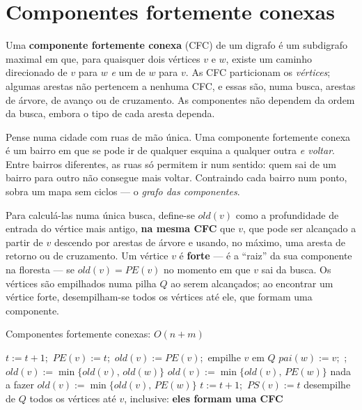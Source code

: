\section{Componentes fortemente conexas}\label{sec:cfc}
Uma \textbf{componente fortemente conexa} (CFC) de um digrafo é um subdigrafo maximal em que, para quaisquer dois vértices $v$ e $w$, existe um caminho direcionado de $v$ para $w$ \emph{e} um de $w$ para $v$. As CFC particionam os \emph{vértices}; algumas arestas não pertencem a nenhuma CFC, e essas são, numa busca, arestas de árvore, de avanço ou de cruzamento. As componentes não dependem da ordem da busca, embora o tipo de cada aresta dependa.

\begin{intuicao}
Pense numa cidade com ruas de mão única. Uma componente fortemente conexa é um bairro em que se pode ir de qualquer esquina a qualquer outra \emph{e voltar}. Entre bairros diferentes, as ruas só permitem ir num sentido: quem sai de um bairro para outro não consegue mais voltar. Contraindo cada bairro num ponto, sobra um mapa sem ciclos --- o \emph{grafo das componentes}.
\end{intuicao}

Para calculá-las numa única busca, define-se $old(v)$ como a profundidade de entrada do vértice mais antigo, \textbf{na mesma CFC} que $v$, que pode ser alcançado a partir de $v$ descendo por arestas de árvore e usando, no máximo, uma aresta de retorno ou de cruzamento. Um vértice $v$ é \textbf{forte} --- é a ``raiz'' da sua componente na floresta --- se $old(v)=PE(v)$ no momento em que $v$ sai da busca. Os vértices são empilhados numa pilha $Q$ ao serem alcançados; ao encontrar um vértice forte, desempilham-se todos os vértices até ele, que formam uma componente.
\begin{pseudo}{Componentes fortemente conexas: $O(n+m)$}
\begin{algorithmic}
  \State $t:=t+1$;\ $PE(v):=t$;\ $old(v):=PE(v)$;\ empilhe $v$ em $Q$
     \State $pai(w):=v$;\ ;\ $old(v):=\min\{old(v),\,old(w)\}$ 
     \State $old(v):=\min\{old(v),\,PE(w)\}$ 
     \State nada a fazer 
     \State $old(v):=\min\{old(v),\,PE(w)\}$ 
    \EndIf
  \EndFor
  \State $t:=t+1$;\ $PS(v):=t$
   \State desempilhe de $Q$ todos os vértices até $v$, inclusive: \textbf{eles formam uma CFC} \EndIf
\EndProcedure
\end{algorithmic}
\end{pseudo}


